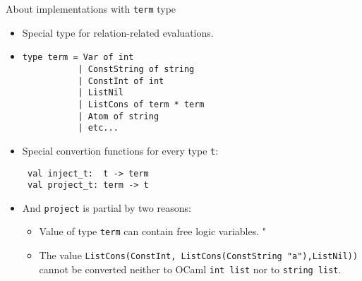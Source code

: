 \documentclass [mathserif]{beamer}
\theoremstyle{definition}
\begin{document}
\begin{frame}[fragile]{About implementations with \texttt{term} type}
\begin{itemize}
 \item Special type for relation-related evaluations.
 \item \begin{lstlisting}
type term = Var of int
           | ConstString of string
           | ConstInt of int
           | ListNil
           | ListCons of term * term
           | Atom of string
           | etc...
 \end{lstlisting}
 \item Special convertion functions for every type \texttt{t}: \begin{lstlisting}
 val inject_t:  t -> term
 val project_t: term -> t
 \end{lstlisting}
 \item And \texttt{project} is partial by two reasons: 
  \begin{itemize}
    \item Value of type \texttt{term} can contain free logic variables. "
    \item The value \texttt{ListCons(ConstInt, ListCons(ConstString "a"),ListNil))} cannot be converted 
    neither to OCaml \texttt{int list} nor to \texttt{string list}.
  \end{itemize}
\end{itemize}
\end{frame}
\end{document}
